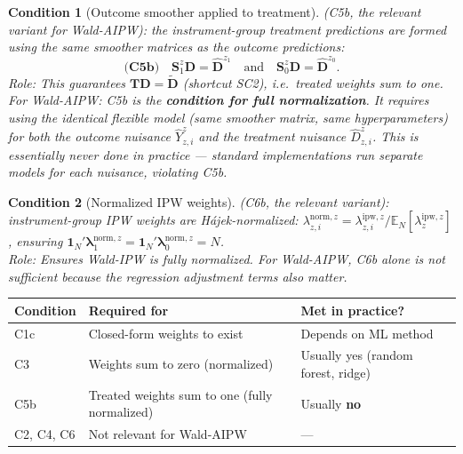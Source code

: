 \documentclass[12pt, a4paper]{article}
\theoremstyle{condstyle}
\newtheorem{condition}{Condition}
\theoremstyle{plain}
\newcommand{\EN}{\mathbb{E}_N}
\newcommand{\bone}{\mathbf{1}_N}
\newcommand{\bD}{\mathbf{D}}
\newcommand{\Dhz}[1]{\hat{\mathbf{D}}^{z_{#1}}}   %
\newcommand{\Sz}[1]{\mathbf{S}^{z}_{#1}}           %
\begin{document}
\begin{condition}[Outcome smoother applied to treatment]\label{cond:C5}
(C5b, the relevant variant for Wald-AIPW): the instrument-group treatment predictions
are formed using the \emph{same} smoother matrices as the outcome predictions:
\begin{equation}
  \textbf{(C5b)}\quad \Sz{1}\bD = \Dhz{1} \quad\text{and}\quad \Sz{0}\bD = \Dhz{0}.
  \label{eq:C5b}
\end{equation}
\textit{Role:} This guarantees $\mathbf{T}\bD = \tilde{\mathbf{D}}$ (shortcut SC2),
i.e.\ treated weights sum to one.\\[2pt]
\textit{For Wald-AIPW:} C5b is the \textbf{condition for full normalization}.
It requires using the \emph{identical} flexible model (same smoother matrix,
same hyperparameters) for both the outcome nuisance $\hat{Y}^z_{z,i}$ and the
treatment nuisance $\hat{D}^z_{z,i}$.
This is essentially never done in practice --- standard implementations
run separate models for each nuisance, violating C5b.
\end{condition}

\begin{condition}[Normalized IPW weights]\label{cond:C6}
(C6b, the relevant variant): instrument-group IPW weights are Hájek-normalized:
$\lambda^{\mathrm{norm},z}_{z,i} = \lambda^{\mathrm{ipw},z}_{z,i}/\EN[\lambda^{\mathrm{ipw},z}_z]$,
ensuring $\bone'\boldsymbol{\lambda}^{\mathrm{norm},z}_1 = \bone'\boldsymbol{\lambda}^{\mathrm{norm},z}_0 = N$.\\[2pt]
\textit{Role:} Ensures Wald-IPW is fully normalized. For Wald-AIPW, C6b alone
is not sufficient because the regression adjustment terms also matter.
\end{condition}

\begin{notebox}
\begin{tabular}{@{}lll@{}}
\toprule
Condition & Required for & Met in practice? \\
\midrule
C1c & Closed-form weights to exist & Depends on ML method \\
C3  & Weights sum to zero (normalized) & Usually yes (random forest, ridge) \\
C5b & Treated weights sum to one (fully normalized) & Usually \textbf{no} \\
C2, C4, C6 & Not relevant for Wald-AIPW & --- \\
\bottomrule
\end{tabular}
\end{notebox}
\end{document}
